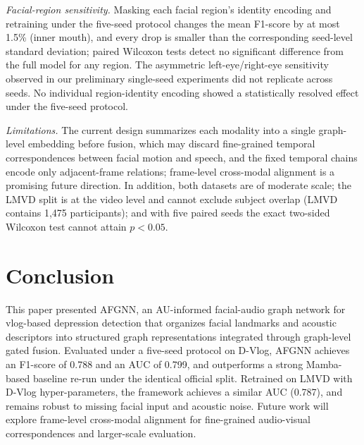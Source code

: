 \documentclass[conference]{IEEEtran}
\begin{document}
\textit{Facial-region sensitivity.}
Masking each facial region's identity encoding and retraining under the five-seed protocol changes the mean F1-score by at most 1.5\% (inner mouth), and every drop is smaller than the corresponding seed-level standard deviation; paired Wilcoxon tests detect no significant difference from the full model for any region. The asymmetric left-eye/right-eye sensitivity observed in our preliminary single-seed experiments did not replicate across seeds. No individual region-identity encoding showed a statistically resolved effect under the five-seed protocol.

\textit{Limitations.}
The current design summarizes each modality into a single graph-level embedding before fusion, which may discard fine-grained temporal correspondences between facial motion and speech, and the fixed temporal chains encode only adjacent-frame relations; frame-level cross-modal alignment is a promising future direction. In addition, both datasets are of moderate scale; the LMVD split is at the video level and cannot exclude subject overlap (LMVD contains 1{,}475 participants); and with five paired seeds the exact two-sided Wilcoxon test cannot attain $p<0.05$.

\section{Conclusion}

This paper presented AFGNN, an AU-informed facial-audio graph network for vlog-based depression detection that organizes facial landmarks and acoustic descriptors into structured graph representations integrated through graph-level gated fusion. Evaluated under a five-seed protocol on D-Vlog, AFGNN achieves an F1-score of 0.788 and an AUC of 0.799, and outperforms a strong Mamba-based baseline re-run under the identical official split. Retrained on LMVD with D-Vlog hyper-parameters, the framework achieves a similar AUC (0.787), and remains robust to missing facial input and acoustic noise. Future work will explore frame-level cross-modal alignment for fine-grained audio-visual correspondences and larger-scale evaluation.


{\footnotesize}
\end{document}
